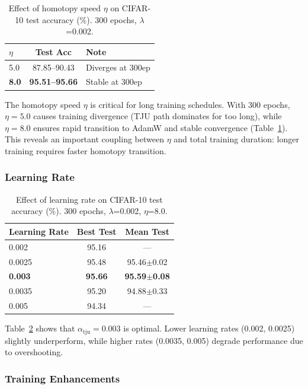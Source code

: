 \documentclass[10pt,twocolumn]{article}
\begin{document}
\begin{table}[ht]
\centering
\caption{Effect of homotopy speed $\eta$ on CIFAR-10 test accuracy (\%). 300 epochs, $\lambda$=0.002.}
\label{tab:ablation_hs}
\begin{tabular}{@{}lcl@{}}
\toprule
\textbf{$\eta$} & \textbf{Test Acc} & \textbf{Note} \\
\midrule
5.0 & 87.85--90.43 & Diverges at 300ep \\
\textbf{8.0} & \textbf{95.51--95.66} & Stable at 300ep \\
\bottomrule
\end{tabular}
\end{table}

The homotopy speed $\eta$ is critical for long training schedules. With 300 epochs, $\eta=5.0$ causes training divergence (TJU path dominates for too long), while $\eta=8.0$ ensures rapid transition to AdamW and stable convergence (Table~\ref{tab:ablation_hs}). This reveals an important coupling between $\eta$ and total training duration: longer training requires faster homotopy transition.

\subsubsection{Learning Rate}

\begin{table}[ht]
\centering
\caption{Effect of learning rate on CIFAR-10 test accuracy (\%). 300 epochs, $\lambda$=0.002, $\eta$=8.0.}
\label{tab:ablation_lr}
\begin{tabular}{@{}lcc@{}}
\toprule
\textbf{Learning Rate} & \textbf{Best Test} & \textbf{Mean Test} \\
\midrule
0.002  & 95.16 & --- \\
0.0025 & 95.48 & 95.46$\pm$0.02 \\
\textbf{0.003}  & \textbf{95.66} & \textbf{95.59$\pm$0.08} \\
0.0035 & 95.20 & 94.88$\pm$0.33 \\
0.005  & 94.34 & --- \\
\bottomrule
\end{tabular}
\end{table}

Table~\ref{tab:ablation_lr} shows that $\alpha_{\text{tju}}=0.003$ is optimal. Lower learning rates (0.002, 0.0025) slightly underperform, while higher rates (0.0035, 0.005) degrade performance due to overshooting.

\subsubsection{Training Enhancements}
\end{document}
